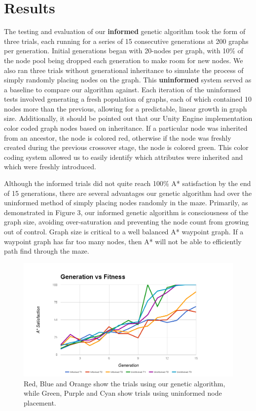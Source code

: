 \section{Results}

	The testing and evaluation of our \textbf{informed} genetic algorithm took the form of three trials, each running for a series of 15 consecutive generations at 200 graphs per generation. Initial generations began with 20-nodes per graph, with 10\% of the node pool being dropped each generation to make room for new nodes. We also ran three trials without generational inheritance to simulate the process of simply randomly placing nodes on the graph. This \textbf{uninformed} system served as a baseline to compare our algorithm against. Each iteration of the uninformed tests involved generating a fresh population of graphs, each of which contained 10 nodes more than the previous, allowing for a predictable, linear growth in graph size. Additionally, it should be pointed out that our Unity Engine implementation color coded graph nodes based on inheritance. If a particular node was inherited from an ancestor, the node is colored red, otherwise if the node was freshly created during the previous crossover stage, the node is colored green. This color coding system allowed us to easily identify which attributes were inherited and which were freshly introduced.
	
	Although the informed trials did not quite reach 100\% A* satisfaction by the end of 15 generations, there are several advantages our genetic algorithm had over the uninformed method of simply placing nodes randomly in the maze. Primarily, as demonstrated in Figure 3, our informed genetic algorithm is consciousness of the graph size, avoiding over-saturation and preventing the node count from growing out of control. Graph size is critical to a well balanced A* waypoint graph. If a waypoint graph has far too many nodes, then A* will not be able to efficiently path find through the maze.
	
		\begin{figure}
			\includegraphics[width=1.2\columnwidth]{tests/genfitness}
			\caption{Red, Blue and Orange show the trials using our genetic algorithm, while Green, Purple and Cyan show trials using uninformed node placement.}
		\end{figure}
		

